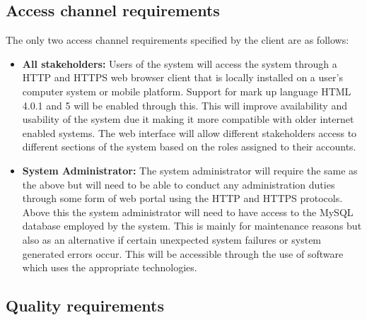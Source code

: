 \documentclass[12pt]{article}
\begin{document}
\subsection{Access channel requirements}
\vspace{0.2in}
The only two access channel requirements specified by the client are as follows:
\begin{itemize}


\item \textbf{All stakeholders:}
Users of the system will access the system through a HTTP and HTTPS web browser client that is locally installed on a user's computer system or mobile platform. Support for mark up language HTML 4.0.1 and 5 will be enabled through this. This will improve availability and usability of the system due it making it more compatible with older internet enabled systems. The web interface will allow different stakeholders access to different sections of the system based on the roles assigned to their accounts. 

\item\textbf{System Administrator:}
The system administrator will require the same as the above but will need to be able to conduct any administration duties through some form of web portal using the HTTP and HTTPS protocols. Above this the system administrator will need to have access to the MySQL database employed by the system. This is mainly for maintenance reasons but also as an alternative if certain unexpected system failures or system generated errors occur. This will be accessible through the use of software which uses the appropriate technologies.

\end{itemize}
\vspace{0.2in}

\subsection{Quality requirements}
\vspace{0.2in}



\vspace{0.1in}
\newpage
\end{document}
